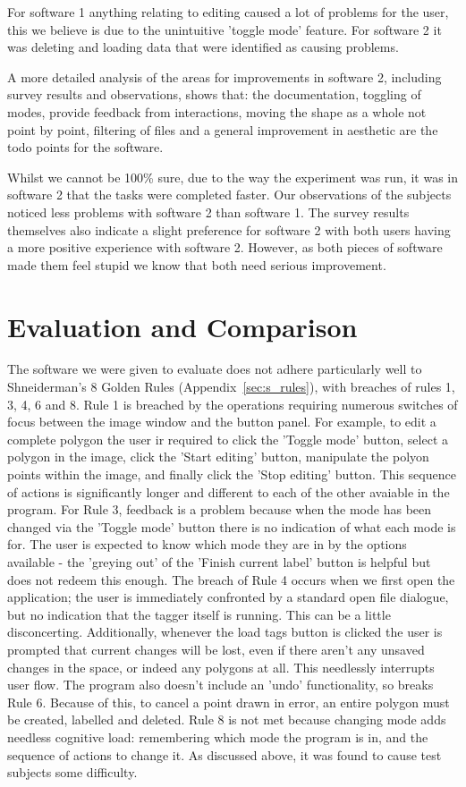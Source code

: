 \documentclass[a4paper,11pt,oneside]{article}
\begin{document}
For software 1 anything relating to editing caused a lot of problems for the user, this we believe is due to the unintuitive 'toggle mode' feature.  For software 2 it was deleting and loading data that were identified as causing problems.

A more detailed analysis of the areas for improvements in software 2, including survey results and observations, shows that: the documentation, toggling of modes, provide feedback from interactions, moving the shape as a whole not point by point, filtering of files and a general improvement in aesthetic are the todo points for the software.

Whilst we cannot be 100\% sure, due to the way the experiment was run, it was in software 2 that the tasks were completed faster.  Our observations of the subjects noticed less problems with software 2 than software 1.  The survey results themselves also indicate a slight preference for software 2 with both users having a more positive experience with software 2. However, as both pieces of software made them feel stupid we know that both need serious improvement.

\section{Evaluation and Comparison}

The software we were given to evaluate does not adhere particularly well to Shneiderman's 8 Golden Rules (Appendix~\ref{sec:s_rules}), with breaches of rules 1, 3, 4, 6 and 8. Rule 1 is breached by the operations requiring numerous switches of focus between the image window and the button panel. For example, to edit a complete polygon the user ir required to click the 'Toggle mode' button, select a polygon in the image, click the 'Start editing' button, manipulate the polyon points within the image, and finally click the 'Stop editing' button. This sequence of actions is significantly longer and different to each of the other avaiable in the program. For Rule 3, feedback is a problem because when the mode has been changed via the 'Toggle mode' button there is no indication of what each mode is for. The user is expected to know which mode they are in by the options available - the 'greying out' of the 'Finish current label' button is helpful but does not redeem this enough. The breach of Rule 4 occurs when we first open the application; the user is immediately confronted by a standard open file dialogue, but no indication that the tagger itself is running. This can be a little disconcerting. Additionally, whenever the load tags button is clicked the user is prompted that current changes will be lost, even if there aren't any unsaved changes in the space, or indeed any polygons at all. This needlessly interrupts user flow. The program also doesn't include an 'undo' functionality, so breaks Rule 6. Because of this, to cancel a point drawn in error, an entire polygon must be created, labelled and deleted. Rule 8 is not met because changing mode adds needless cognitive load: remembering which mode the program is in, and the sequence of actions to change it. As discussed above, it was found to cause test subjects some difficulty.
\end{document}

